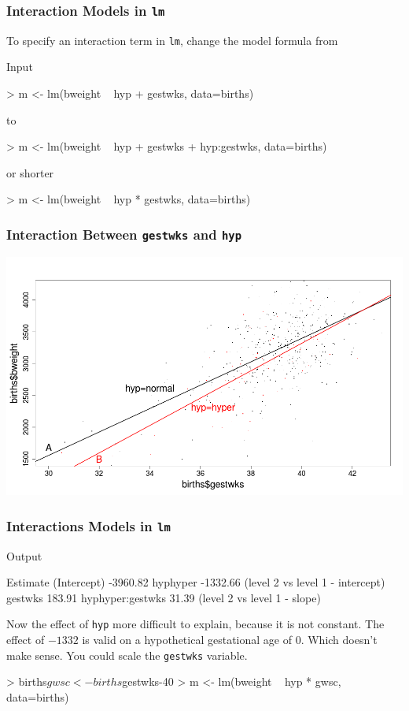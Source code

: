 \documentclass[xcolor={table}]{beamer}
\begin{document}
\begin{frame}[fragile]\frametitle{Interaction Models in \texttt{lm}}
To specify an interaction term in \texttt{lm}, change the model formula from
\begin{exampleblock}{Input}\small
\begin{semiverbatim}
> m <- lm(bweight ~ hyp + gestwks, data=births)
\end{semiverbatim}
to
\begin{semiverbatim}
> m <- lm(bweight ~ hyp + gestwks + hyp:gestwks, data=births)
\end{semiverbatim}
or shorter
\begin{semiverbatim}
> m <- lm(bweight ~ hyp * gestwks, data=births)
\end{semiverbatim}
\end{exampleblock}
\end{frame}


\begin{frame}[shrink=5]\frametitle{Interaction Between \texttt{gestwks} and  \texttt{hyp}}
\begin{center}
\includegraphics[height=8cm]{model2.png}
\end{center}
\end{frame}


\begin{frame}[fragile]\frametitle{Interactions Models in \texttt{lm}}
\begin{exampleblock}{Output}
\begin{semiverbatim}
                 Estimate
(Intercept)      -3960.82
hyphyper         -1332.66 (level 2 vs level 1 - intercept)
gestwks            183.91
hyphyper:gestwks    31.39 (level 2 vs level 1 - slope)
\end{semiverbatim}
\end{exampleblock}
Now the effect of \texttt{hyp} more difficult to explain, because it is not constant. The effect of  $-1332$ is valid on a hypothetical gestational age of $0$. Which doesn't make sense. You could scale the \texttt{gestwks} variable. 
\begin{semiverbatim}
> births$gwsc <- births$gestwks-40
> m <- lm(bweight ~ hyp * gwsc, data=births)
\end{semiverbatim}
\end{frame}
\end{document}
